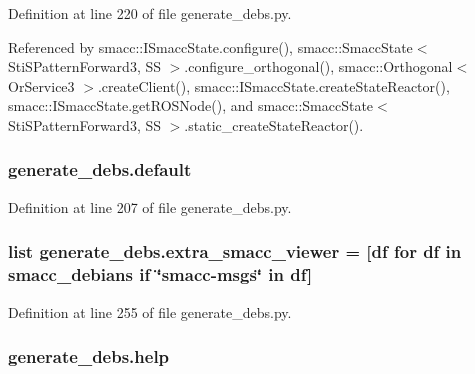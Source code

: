 Definition at line 220 of file generate\+\_\+debs.\+py.



Referenced by smacc\+::\+I\+Smacc\+State.\+configure(), smacc\+::\+Smacc\+State$<$ Sti\+S\+Pattern\+Forward3, S\+S $>$.\+configure\+\_\+orthogonal(), smacc\+::\+Orthogonal$<$ Or\+Service3 $>$.\+create\+Client(), smacc\+::\+I\+Smacc\+State.\+create\+State\+Reactor(), smacc\+::\+I\+Smacc\+State.\+get\+R\+O\+S\+Node(), and smacc\+::\+Smacc\+State$<$ Sti\+S\+Pattern\+Forward3, S\+S $>$.\+static\+\_\+create\+State\+Reactor().

\subsubsection[{\texorpdfstring{default}{default}}]{\setlength{\rightskip}{0pt plus 5cm}generate\+\_\+debs.\+default}\hypertarget{namespacegenerate__debs_a3d67a92b7eb3a59c397dc9fdd1c67558}{}\label{namespacegenerate__debs_a3d67a92b7eb3a59c397dc9fdd1c67558}


Definition at line 207 of file generate\+\_\+debs.\+py.

\subsubsection[{\texorpdfstring{extra\+\_\+smacc\+\_\+viewer}{extra_smacc_viewer}}]{\setlength{\rightskip}{0pt plus 5cm}list generate\+\_\+debs.\+extra\+\_\+smacc\+\_\+viewer = \mbox{[}df for df in {\bf smacc\+\_\+debians} if \char`\"{}smacc-\/msgs\char`\"{} in df\mbox{]}}\hypertarget{namespacegenerate__debs_aae153eaf5f6cddad5899c36fef7e1b10}{}\label{namespacegenerate__debs_aae153eaf5f6cddad5899c36fef7e1b10}


Definition at line 255 of file generate\+\_\+debs.\+py.

\subsubsection[{\texorpdfstring{help}{help}}]{\setlength{\rightskip}{0pt plus 5cm}generate\+\_\+debs.\+help}\hypertarget{namespacegenerate__debs_ab09f4294da5036d5f6881672de9ed9c7}{}\label{namespacegenerate__debs_ab09f4294da5036d5f6881672de9ed9c7}


